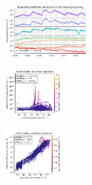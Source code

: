 \begin{figure}[H]
    \begin{subfigure}
    \centering
    \includegraphics[width=0.4\textwidth]{prediction/figures/models/sparsebayesianmodel-training-prediction.pdf}
    \end{subfigure}
    \begin{subfigure}
    \centering
    \includegraphics[width=0.275\textwidth]{prediction/figures/models/sparsebayesianmodel-test-generalisation.pdf}
    \end{subfigure}
    \begin{subfigure}
    \centering
    \includegraphics[width=0.275\textwidth]{prediction/figures/models/sparsebayesianmodel-test-prediction.pdf}
    \end{subfigure}
   

\end{figure}
